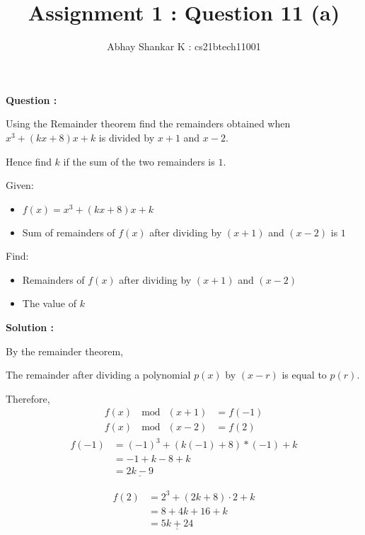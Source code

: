 \documentclass[11pt, oneside, twocolumn]{amsart}   	%
\title{Assignment 1 : Question 11 (a)}
\author{Abhay Shankar K : cs21btech11001}
\begin{document}
\maketitle
\textbf{Question :}

Using the Remainder theorem find the remainders obtained when $x^3 + (kx + 8)x + k$ is divided by $x + 1$ and $x - 2$.

Hence find $k$ if the sum of the two remainders is $1$.

Given:
\begin{itemize}
	\item $f(x) = x^3 + (kx + 8)x + k$ 
	\item Sum of remainders of $f(x)$ after dividing by $(x + 1)$ and $(x - 2)$ is $1$
\end{itemize}
Find:
\begin{itemize}
	\item Remainders of $f(x)$ after dividing by $(x + 1)$ and $(x - 2)$
	\item The value of $k$
\end{itemize}

\textbf{Solution :}

By the remainder theorem,

	 The remainder after dividing a polynomial $p(x)$ by $(x - r)$ is equal to $p(r)$.

	 Therefore,
	\begin{align}
  		f(x)\ \mod\ (x + 1) &= f(-1) \\
  		f(x)\ \mod\ (x - 2) &= f(2)
	\end{align}
	\begin{align}
 		f(-1) &= (-1)^3 + (k(-1) + 8)*(-1) + k \\
		 &= -1 + k - 8 + k \\
		 &= \underline{2k - 9}
	\end{align}
		
	\begin{align}
		f(2) &= 2^3 + (2k + 8) \cdot 2 + k \\
		  &= 8 + 4k + 16 + k \\
		 &= \underline{5k + 24}
	\end{align}
		  
\end{document}
